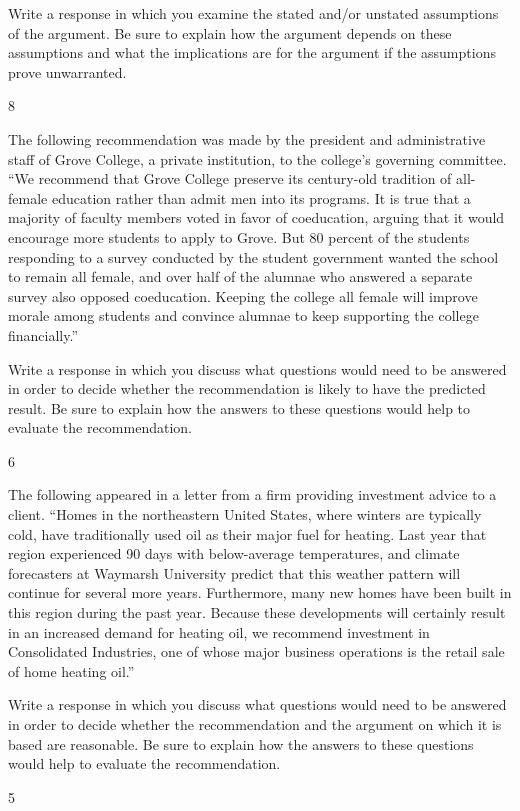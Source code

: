 \documentclass[]{article}
\begin{document}
Write a response in which you examine the stated and/or unstated
assumptions of the argument. Be sure to explain how the argument depends
on these assumptions and what the implications are for the argument if
the assumptions prove unwarranted.

8

The following recommendation was made by the president and
administrative staff of Grove College, a private institution, to the
college's governing committee. ``We recommend that Grove College
preserve its century-old tradition of all-female education rather than
admit men into its programs. It is true that a majority of faculty
members voted in favor of coeducation, arguing that it would encourage
more students to apply to Grove. But 80 percent of the students
responding to a survey conducted by the student government wanted the
school to remain all female, and over half of the alumnae who answered a
separate survey also opposed coeducation. Keeping the college all female
will improve morale among students and convince alumnae to keep
supporting the college financially.''

Write a response in which you discuss what questions would need to be
answered in order to decide whether the recommendation is likely to have
the predicted result. Be sure to explain how the answers to these
questions would help to evaluate the recommendation.

6

The following appeared in a letter from a firm providing investment
advice to a client. ``Homes in the northeastern United States, where
winters are typically cold, have traditionally used oil as their major
fuel for heating. Last year that region experienced 90 days with
below-average temperatures, and climate forecasters at Waymarsh
University predict that this weather pattern will continue for several
more years. Furthermore, many new homes have been built in this region
during the past year. Because these developments will certainly result
in an increased demand for heating oil, we recommend investment in
Consolidated Industries, one of whose major business operations is the
retail sale of home heating oil.''

Write a response in which you discuss what questions would need to be
answered in order to decide whether the recommendation and the argument
on which it is based are reasonable. Be sure to explain how the answers
to these questions would help to evaluate the recommendation.

5
\end{document}
